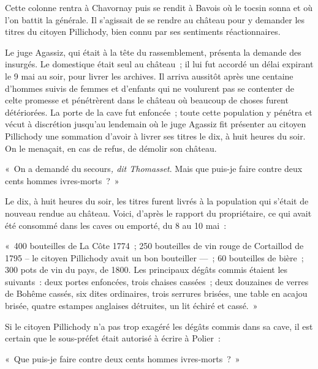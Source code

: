 \documentclass[french,twoside]{book} %
\newenvironment{quoteblock}%
  {\begin{quoting}}
  {\end{quoting}}
\newenvironment{quotebar}{%
    \def\FrameCommand{{\color{rubric!10!}\vrule width 0.5em} \hspace{0.9em}}%
    \def\OuterFrameSep{\itemsep} %
    \MakeFramed {\advance\hsize-\width \FrameRestore}
  }%
  {%
    \endMakeFramed
  }
\renewenvironment{quoteblock}%
  {%
    \savenotes
    \setstretch{0.9}
    \normalfont
    \begin{quotebar}
  }
  {%
    \end{quotebar}
    \spewnotes
  }
\begin{document}
\noindent Cette colonne rentra à Chavornay puis se rendit à Bavois où le tocsin sonna et où l’on battit la générale. Il s’agissait de se rendre au château pour y demander les titres du citoyen Pillichody, bien connu par ses sentiments réactionnaires.\par
Le juge Agassiz, qui était à la tête du rassemblement, présenta la demande des insurgés. Le domestique était seul au château ; il lui fut accordé un délai expirant le 9 mai au soir, pour livrer les archives. Il arriva aussitôt après une centaine d’hommes suivis de femmes et d’enfants qui ne voulurent pas se contenter de celte promesse et pénétrèrent dans le château où beaucoup de choses furent détériorées. La porte de la cave fut enfoncée ; toute cette population y pénétra et vécut à discrétion jusqu’au lendemain où le juge Agassiz fit présenter au citoyen Pillichody une sommation d’avoir à livrer ses titres le dix, à huit heures du soir. On le menaçait, en cas de refus, de démolir son château.\par

\begin{quoteblock}
\noindent « On a demandé du secours\emph{, dit Thomasset}. Mais que puis-je faire contre deux cents hommes ivres-morts ? »\end{quoteblock}

\noindent Le dix, à huit heures du soir, les titres furent livrés à la population qui s’était de nouveau rendue au château. Voici, d’après le rapport du propriétaire, ce qui avait été consommé dans les caves ou emporté, du 8 au 10 mai :\par

\begin{quoteblock}
\noindent « 400 bouteilles de La Côte 1774 ; 250 bouteilles de vin rouge de Cortaillod de 1795 – le citoyen Pillichody avait un bon bouteiller — ; 60 bouteilles de bière ; 300 pots de vin du pays, de 1800. Les principaux dégâts commis étaient les suivants : deux portes enfoncées, trois chaises cassées ; deux douzaines de verres de Bohême cassés, six dites ordinaires, trois serrures brisées, une table en acajou brisée, quatre estampes anglaises détruites, un lit échiré et cassé. »\end{quoteblock}

\noindent Si le citoyen Pillichody n’a pas trop exagéré les dégâts commis dans sa cave, il est certain que le sous-préfet était autorisé à écrire à Polier :\par

\begin{quoteblock}
\noindent « Que puis-je faire contre deux cents hommes ivres-morts ? »\end{quoteblock}
\end{document}
